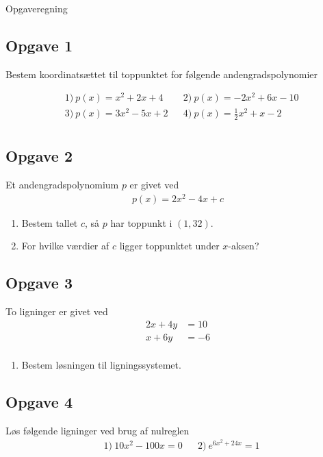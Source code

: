 
\begin{center}
\Huge
	Opgaveregning
\end{center}

\subsection*{Opgave 1}
Bestem koordinatsættet til toppunktet for følgende andengradspolynomier

\begin{align*}
	&1) \ p(x) = x^2 + 2x + 4 &  &2) \ p(x) = -2x^2 + 6x - 10 \\
	&3) \ p(x) = 3x^2 - 5x + 2 &  &4) \ p(x) = \frac{1}{2}x^2 + x - 2 \\
\end{align*}

\subsection*{Opgave 2}

Et andengradspolynomium $p$ er givet ved
\begin{align*}
	p(x) = 2x^2 -4x + c
\end{align*}
\begin{enumerate}[label=\roman*)]
	\item Bestem tallet $c$, så $p$ har toppunkt i $(1,32)$.
	\item For hvilke værdier af $c$ ligger toppunktet under $x$-aksen?
\end{enumerate}

\subsection*{Opgave 3}
To ligninger er givet ved
\begin{align*}
	2x + 4y &= 10\\
	x + 6y &= -6\\
\end{align*}
\begin{enumerate}[label=\roman*)]
	\item Bestem løsningen til ligningssystemet.
\end{enumerate}

\subsection*{Opgave 4}
Løs følgende ligninger ved brug af nulreglen
\begin{align*}
	&1) \ 10x^2 - 100x = 0 &  &2) \ e^{6x^2 + 24x} = 1
\end{align*}

